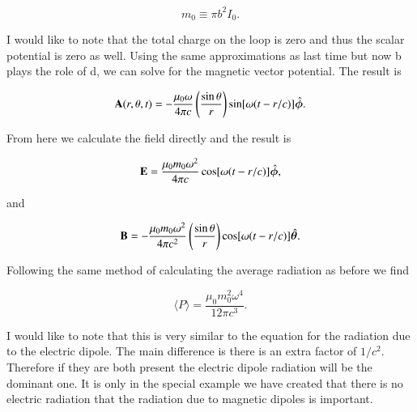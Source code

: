 \documentclass[preprint, review,12pt]{elsarticle}
\def\b{\textbf}
\def\={\equiv}
\def\9{\left(}
\def\0{\right)}
\newcommand{\hbm}[1]{\hat{\bm #1}}
\newcommand{\brak}[1]{\langle #1 \rangle}
\begin{document}
\begin{equation}
    m_0 \= \pi b^2 I_0.
\end{equation}

I would like to note that the total charge on the loop is zero and thus the scalar potential is zero as well. Using the same approximations as last time but now b plays the role of d, we can solve for the magnetic vector potential. The result is

\begin{equation}
    \b A(r, \theta, t) = - \frac{\mu_0 \omega}{4 \pi c} \9 \frac{\sin\theta}{r} \0 \sin[\omega (t-r/c)] \hbm{\phi}.
\end{equation}

From here we calculate the field directly and the result is

\begin{equation}
    \b E = \frac{\mu_0 m_0 \omega^2}{4 \pi c}\cos[\omega(t-r/c)] \hbm{\phi},
\end{equation}

and

\begin{equation}
    \b B = - \frac{\mu_0 m_0 \omega^2}{4 \pi c^2} \9 \frac{\sin\theta}{r} \0 \cos[\omega(t-r/c)]\hbm{\theta}.
\end{equation}

Following the same method of calculating the average radiation as before we find

\begin{equation}
    \brak{P} = \frac{\mu_0 m_0^2 \omega^4}{12 \pi c^3}.
\end{equation}

I would like to note that this is very similar to the equation for the radiation due to the electric dipole. The main difference is there is an extra factor of $1/c^2$. Therefore if they are both present the electric dipole radiation will be the dominant one. It is only in the special example we have created that there is no electric radiation that the radiation due to magnetic dipoles is important.
\end{document}
